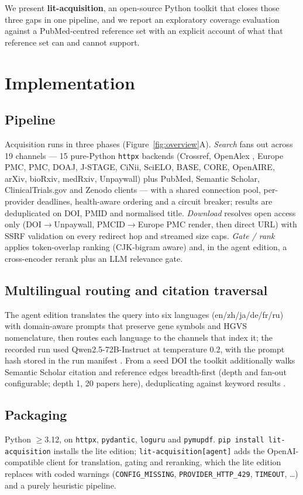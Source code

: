 \documentclass[10pt,twocolumn,letterpaper]{article}
\begin{document}
We present \textbf{lit-acquisition}, an open-source Python toolkit that closes
those three gaps in one pipeline, and we report an exploratory coverage
evaluation against a Pub\-Med-centred reference set with an explicit account of
what that reference set can and cannot support.

\section{Implementation}
\subsection*{Pipeline}
Acquisition runs in three phases (Figure~\ref{fig:overview}A). \emph{Search}
fans out across 19 channels --- 15 pure-Python \texttt{httpx} backends
(Crossref, OpenAlex \cite{priem2022}, Europe PMC, PMC, DOAJ, J-STAGE, CiNii, SciELO, BASE, CORE,
OpenAIRE, arXiv, bioRxiv, medRxiv, Unpaywall) plus PubMed, Semantic Scholar,
ClinicalTrials.gov and Zenodo clients --- with a shared connection
pool, per-provider deadlines, health-aware ordering and a circuit breaker;
results are deduplicated on DOI, PMID and normalised title.
\emph{Download} resolves open access only (DOI$\rightarrow$Unpaywall,
PMCID$\rightarrow$Europe PMC render, then direct URL) with SSRF validation on
every redirect hop and streamed size caps. \emph{Gate / rank} applies
token-overlap ranking (CJK-bigram aware) and, in the agent edition, a
cross-encoder rerank \cite{chen2024} plus an LLM relevance gate.

\subsection*{Multilingual routing and citation traversal}
The agent edition translates the query into six languages
(en/zh/ja/de/fr/ru) with domain-aware prompts that preserve gene symbols and
HGVS nomenclature, then routes each language to the channels that index it; the
recorded run used Qwen2.5-72B-Instruct at temperature 0.2, with the prompt hash
stored in the run manifest \cite{qwen2024}. From a seed DOI the toolkit
additionally walks Semantic Scholar citation and reference edges breadth-first
(depth and fan-out configurable; depth 1, 20 papers here), deduplicating
against keyword results \cite{kinney2023}.

\subsection*{Packaging}
Python $\geq$3.12, on \texttt{httpx}, \texttt{pydantic}, \texttt{loguru} and
\texttt{pymupdf}. \texttt{pip install lit-acquisition} installs the lite
edition; \texttt{lit-acquisition[agent]} adds the OpenAI-compatible client for
translation, gating and reranking, which the lite edition replaces with coded
warnings (\texttt{CONFIG\_MISSING}, \texttt{PROVIDER\_HTTP\_429},
\texttt{TIMEOUT}, \dots) and a purely heuristic pipeline.
\end{document}
